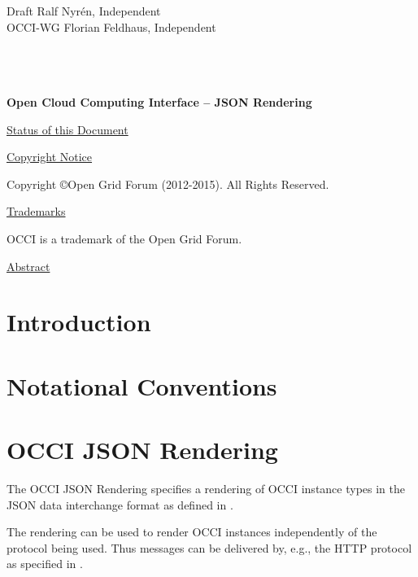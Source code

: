 \documentclass[10pt,a4paper]{article}
\begin{document}
\thispagestyle{empty}

Draft \hfill Ralf Nyrén, Independent \\
OCCI-WG \hfill Florian Feldhaus, Independent\\
\\
\\
\\

\vspace*{0.5in}

\begin{Large}
\textbf{Open Cloud Computing Interface -- JSON Rendering}
\end{Large}

\vspace*{0.5in}

\underline{Status of this Document}



\underline{Copyright Notice}

Copyright \copyright Open Grid Forum (2012-2015). All Rights Reserved.

\underline{Trademarks}

OCCI is a trademark of the Open Grid Forum.

\underline{Abstract}



\newpage
\tableofcontents
\newpage

\section{Introduction}


\section{Notational Conventions}


\section{OCCI JSON Rendering}
\label{sec:json_format}
The OCCI JSON Rendering specifies a rendering of OCCI instance types in the JSON
data interchange format as defined in \cite{rfc4627}.

The rendering can be used to render OCCI instances independently of the
protocol being used. Thus messages can be delivered by, e.g., the HTTP
protocol as specified in \cite{occi:http_protocol}.
\end{document}
